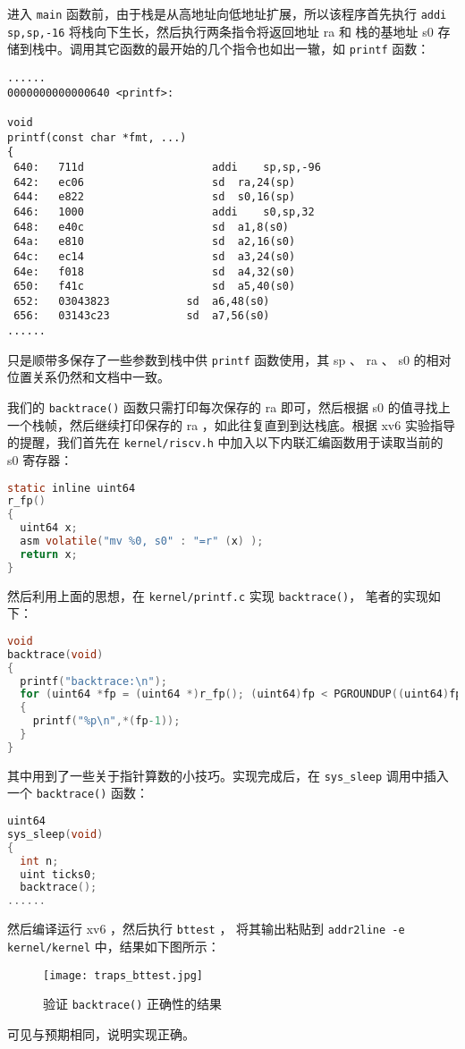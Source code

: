 进入 \lstinline{main} 函数前，由于栈是从高地址向低地址扩展，所以该程序首先执行 \lstinline{addi sp,sp,-16} 将栈向下生长，然后执行两条指令将返回地址 ra 和 栈的基地址 s0 存储到栈中。调用其它函数的最开始的几个指令也如出一辙，如 \lstinline{printf} 函数：
\begin{lstlisting}
......
0000000000000640 <printf>:

void
printf(const char *fmt, ...)
{
 640:	711d                	addi	sp,sp,-96
 642:	ec06                	sd	ra,24(sp)
 644:	e822                	sd	s0,16(sp)
 646:	1000                	addi	s0,sp,32
 648:	e40c                	sd	a1,8(s0)
 64a:	e810                	sd	a2,16(s0)
 64c:	ec14                	sd	a3,24(s0)
 64e:	f018                	sd	a4,32(s0)
 650:	f41c                	sd	a5,40(s0)
 652:	03043823          	sd	a6,48(s0)
 656:	03143c23          	sd	a7,56(s0)
......
\end{lstlisting}

只是顺带多保存了一些参数到栈中供 \lstinline{printf} 函数使用，其 sp 、 ra 、 s0 的相对位置关系仍然和文档中一致。

我们的 \lstinline{backtrace()} 函数只需打印每次保存的 ra 即可，然后根据 s0 的值寻找上一个栈帧，然后继续打印保存的 ra ，如此往复直到到达栈底。根据 xv6 实验指导的提醒，我们首先在 \lstinline{kernel/riscv.h} 中加入以下内联汇编函数用于读取当前的 s0 寄存器：
\begin{lstlisting}[language=C]
static inline uint64
r_fp()
{
  uint64 x;
  asm volatile("mv %0, s0" : "=r" (x) );
  return x;
}
\end{lstlisting}

然后利用上面的思想，在 \lstinline{kernel/printf.c} 实现 \lstinline{backtrace()}， 笔者的实现如下：
\begin{lstlisting}[language=C]
void
backtrace(void)
{
  printf("backtrace:\n");
  for (uint64 *fp = (uint64 *)r_fp(); (uint64)fp < PGROUNDUP((uint64)fp); fp = (uint64 *)(*(fp-2)))
  {
    printf("%p\n",*(fp-1));
  }
}
\end{lstlisting}

其中用到了一些关于指针算数的小技巧。实现完成后，在 \lstinline{sys_sleep} 调用中插入一个 \lstinline{backtrace()} 函数：
\begin{lstlisting}[language=C]
uint64
sys_sleep(void)
{
  int n;
  uint ticks0;
  backtrace();
......
\end{lstlisting}

然后编译运行 xv6 ，然后执行 \lstinline{bttest} ， 将其输出粘贴到 \lstinline{addr2line -e kernel/kernel} 中，结果如下图所示：
\begin{figure}[H]
  \centering
  \texttt{[image: traps\_bttest.jpg]}
  \caption{ 验证 \lstinline{backtrace()} 正确性的结果 }
\end{figure}
可见与预期相同，说明实现正确。

